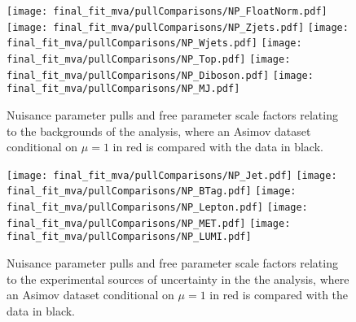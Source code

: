 %
\begin{figure}[hb]
\centering
\texttt{[image: final\_fit\_mva/pullComparisons/NP\_FloatNorm.pdf]}
\texttt{[image: final\_fit\_mva/pullComparisons/NP\_Zjets.pdf]}
\texttt{[image: final\_fit\_mva/pullComparisons/NP\_Wjets.pdf]}
\texttt{[image: final\_fit\_mva/pullComparisons/NP\_Top.pdf]}
\texttt{[image: final\_fit\_mva/pullComparisons/NP\_Diboson.pdf]}
\texttt{[image: final\_fit\_mva/pullComparisons/NP\_MJ.pdf]}
\caption{Nuisance parameter pulls and free parameter scale factors relating
  to the backgrounds of the analysis, where an Asimov dataset conditional on
  $\mu=1$ in red is compared with the data in black.}
\label{fig:nppulls_012L_MVAVH_a} 
\end{figure}
%
\begin{figure}[hb]
\centering
\texttt{[image: final\_fit\_mva/pullComparisons/NP\_Jet.pdf]}
\texttt{[image: final\_fit\_mva/pullComparisons/NP\_BTag.pdf]}
\texttt{[image: final\_fit\_mva/pullComparisons/NP\_Lepton.pdf]}
\texttt{[image: final\_fit\_mva/pullComparisons/NP\_MET.pdf]}
\texttt{[image: final\_fit\_mva/pullComparisons/NP\_LUMI.pdf]}
\caption{Nuisance parameter pulls and free parameter scale factors relating to the
  experimental sources of uncertainty in the the analysis, where an Asimov
  dataset conditional on $\mu=1$ in red is compared with the data in black.}
\label{fig:nppulls_012L_MVAVH_b}
\end{figure}
%
